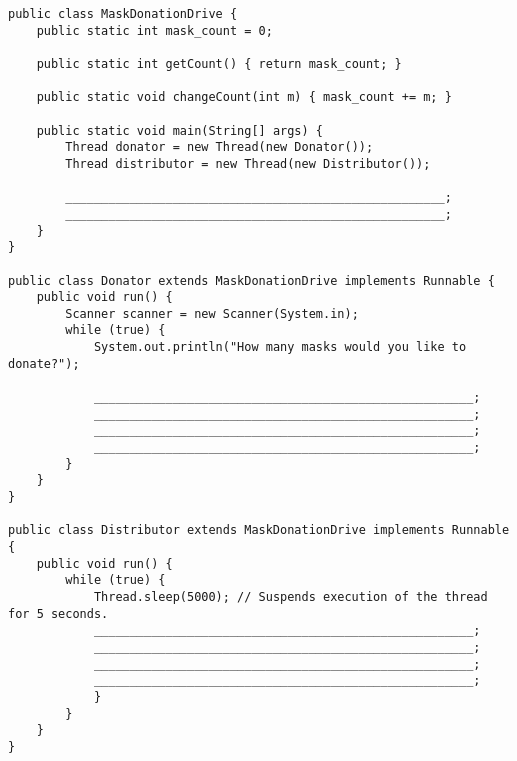 \begin{lstlisting}
public class MaskDonationDrive {
    public static int mask_count = 0;

    public static int getCount() { return mask_count; }

    public static void changeCount(int m) { mask_count += m; }

    public static void main(String[] args) {
        Thread donator = new Thread(new Donator());
        Thread distributor = new Thread(new Distributor());

        _____________________________________________________;
        _____________________________________________________;
    }
}

public class Donator extends MaskDonationDrive implements Runnable {
    public void run() {
        Scanner scanner = new Scanner(System.in);
        while (true) {
            System.out.println("How many masks would you like to donate?");
            
            _____________________________________________________;
            _____________________________________________________;
            _____________________________________________________;
            _____________________________________________________;
        }
    }
}

public class Distributor extends MaskDonationDrive implements Runnable {
    public void run() {
        while (true) {
            Thread.sleep(5000); // Suspends execution of the thread for 5 seconds.
            _____________________________________________________;
            _____________________________________________________;
            _____________________________________________________;
            _____________________________________________________;
            }
        }
    }
}
\end{lstlisting}
\fi

